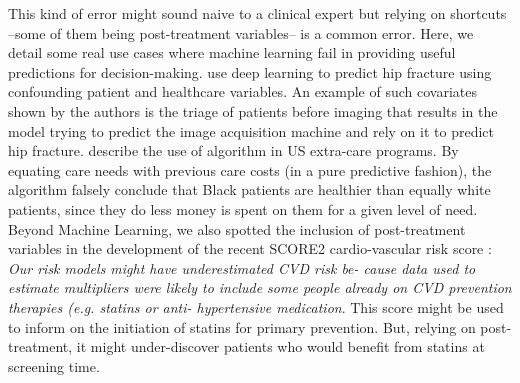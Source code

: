 \documentclass[10pt,letterpaper]{article}
\begin{document}
This kind of error might sound naive to a clinical expert but relying on
shortcuts --some of them being post-treatment variables-- is a common error.
Here, we detail some real use cases where machine learning fail in providing
useful predictions for decision-making. \cite{badgeley2019deep} use deep
learning to predict hip fracture using confounding patient and healthcare
variables. An example of such covariates shown by the authors is the triage of
patients before imaging that results in the model trying to predict the image
acquisition machine and rely on it to predict hip fracture.
\cite{obermeyer2019dissecting} describe the use of algorithm in US extra-care
programs. By equating care needs with previous care costs (in a pure
predictive fashion), the algorithm falsely conclude that Black patients are
healthier than equally white patients, since they do less money is spent on
them for a given level of need. Beyond Machine Learning, we also spotted the
inclusion of post-treatment variables in the development of the recent SCORE2
cardio-vascular risk score \cite{score22021score2}: \emph{Our risk models
  might have underestimated CVD risk be- cause data used to estimate multipliers
  were likely to include some people already on CVD prevention therapies (e.g.
  statins or anti- hypertensive medication}. This score might be used to inform
on the initiation of statins for primary prevention. But, relying on
post-treatment, it might under-discover patients who would benefit from
statins at screening time.
\end{document}
